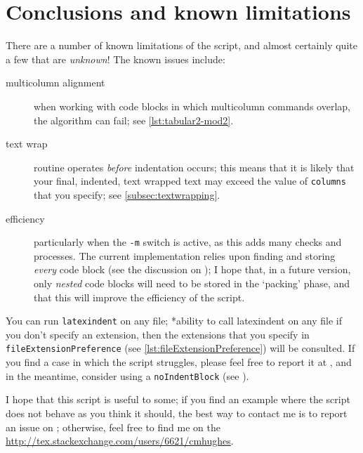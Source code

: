 \section{Conclusions and known limitations}\label{sec:knownlimitations}
 There are a number of known limitations of the script, and almost certainly quite a few
 that are \emph{unknown}!  The known issues include:
 \begin{description}
  \item[multicolumn alignment] when working with code blocks in which multicolumn commands
   overlap, the algorithm can fail; see \vref{lst:tabular2-mod2}.
  \item[text wrap] routine operates \emph{before} indentation occurs; this means that it is
   likely that your final, indented, text wrapped text may exceed the value of
   \texttt{columns} that you specify; see \vref{subsec:textwrapping}.
  \item[efficiency] particularly when the \texttt{-m} switch is active, as this adds many checks
   and processes. The current implementation relies upon finding and storing \emph{every}
   code block (see the discussion on ); I hope that, in a future
   version, only \emph{nested} code blocks will need to be stored in the `packing' phase,
   and that this will improve the efficiency of the script.
 \end{description}

 You can run \texttt{latexindent} on any file; *{ability to call
 latexindent on any file} if you don't specify an extension, then the extensions that you
 specify in \lstinline[breaklines=true]!fileExtensionPreference! (see
 \vref{lst:fileExtensionPreference}) will be consulted. If you find a case in which the
 script struggles, please feel free to report it at \cite{latexindent-home}, and in the
 meantime, consider using a \texttt{noIndentBlock} (see ).%

 I hope that this script is useful to some; if you find an example where the script does
 not behave as you think it should, the best way to contact me is to report an issue on
 \cite{latexindent-home}; otherwise, feel free to find me on the
 \url{http://tex.stackexchange.com/users/6621/cmhughes}.
